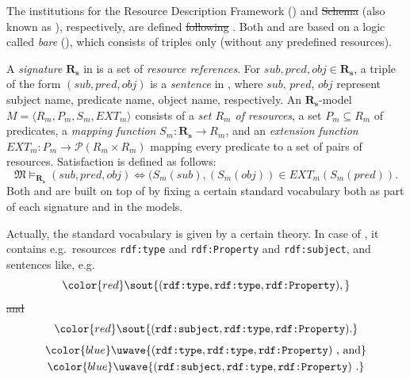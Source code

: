 \documentclass[10pt,fleqn,final]{scrreprt}
\providecommand{\DIFadd}[1]{{\protect\color{blue}\uwave{#1}}} %
\providecommand{\DIFdel}[1]{{\protect\color{red}\sout{#1}}}                      %
\providecommand{\DIFaddbegin}{} %
\providecommand{\DIFaddend}{} %
\providecommand{\DIFdelbegin}{} %
\providecommand{\DIFdelend}{} %
\begin{document}
\DIFaddbegin \begin{definition}
\DIFaddend The institutions for the Resource Description Framework (\RDF) and \RDF
\DIFdelbegin \DIFdel{Schema }\DIFdelend \DIFaddbegin \DIFadd{Sche}\-\DIFadd{ma }\DIFaddend (also known as \RDFS), respectively, are defined \DIFdelbegin \DIFdel{following }\DIFdelend \DIFaddbegin \DIFadd{in the
following~}\DIFaddend \cite{Lucanu}. Both \RDF and \RDFS are based on a logic called
\emph{bare} \RDF (\SimpleRDF), which consists of triples only (without
any predefined resources).

A \textit{signature} $\mathbf{R_s}$ in \SimpleRDF is a set of
\textit{resource references}. For $sub, pred, obj \in \mathbf{R_s}$, a
triple of the form $(sub, pred, obj)$ is a \textit{sentence} in \SimpleRDF,
where $sub$, $pred$, $obj$ represent subject name, predicate name,
object name, respectively. An $\mathbf{R_s}$-model $M =
\langle R_m, P_m, S_m, EXT_m \rangle$ consists of a \textit{set $R_m$
  of resources}, a set $P_m \subseteq R_m$ of predicates, a
\textit{mapping function} $S_m:\mathbf{R_s} \rightarrow R_m$, and an
\textit{extension function} $EXT_m: P_m \rightarrow \mathcal{P}(R_m
\times R_m)$ mapping every predicate to a set of pairs of
resources. Satisfaction is defined as follows:
%
\[\mathfrak{M} \models_{\mathbf{R_s}} (sub, pred, obj) \Leftrightarrow (S_{m}(sub),
(S_{m}(obj)) \in EXT_{m} (S_m(pred)). \]
%
Both \RDF and \RDFS are built on top of \SimpleRDF by fixing a certain
standard vocabulary both as part of each signature and in the models.

Actually, the standard vocabulary is given by a certain theory. In case
of \RDF, it contains e.g.\ resources \texttt{rdf:type} and
\texttt{rdf:Property} and \texttt{rdf:subject}, and sentences like, e.g.
\DIFdelbegin %
\begin{displaymath}\DIFdel{(\texttt{rdf:type},\texttt{rdf:type},\texttt{rdf:Property}),}\end{displaymath} %
\DIFdel{and 
}\begin{displaymath}\DIFdel{(\texttt{rdf:subject}, \texttt{rdf:type},\texttt{rdf:Property}).}\end{displaymath}
\DIFdelend %
\DIFaddbegin \begin{gather*}\DIFadd{
  (\texttt{rdf:type},\texttt{rdf:type},\texttt{rdf:Property})
\ \text{, and}}\\
  \DIFadd{(\texttt{rdf:subject}, \texttt{rdf:type},\texttt{rdf:Property})
\ \text{.}
}\end{gather*}
\DIFaddend 


\end{definition}
\end{document}
